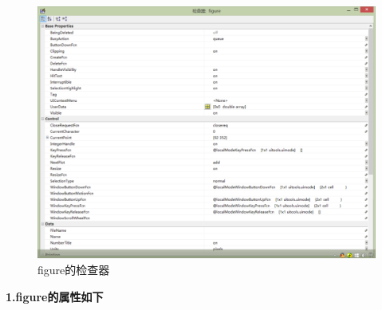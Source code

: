         \begin{figure}[H]
        \centering
        \includegraphics[width = 14cm]{images/25.jpg}
        \caption{figure的检查器}
        \label{fig:figure的检查器}
        \end{figure}
        \textbf{1.figure的属性如下}
